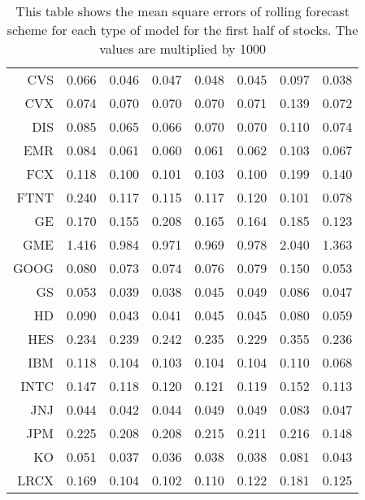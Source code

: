 \begin{table}[ht]
\begin{tabular}{rrrrrrrr}
  CVS & 0.066 & 0.046 & 0.047 & 0.048 & 0.045 & 0.097 & 0.038 \\ 
  CVX & 0.074 & 0.070 & 0.070 & 0.070 & 0.071 & 0.139 & 0.072 \\ 
  DIS & 0.085 & 0.065 & 0.066 & 0.070 & 0.070 & 0.110 & 0.074 \\ 
  EMR & 0.084 & 0.061 & 0.060 & 0.061 & 0.062 & 0.103 & 0.067 \\ 
  FCX & 0.118 & 0.100 & 0.101 & 0.103 & 0.100 & 0.199 & 0.140 \\ 
  FTNT & 0.240 & 0.117 & 0.115 & 0.117 & 0.120 & 0.101 & 0.078 \\ 
  GE & 0.170 & 0.155 & 0.208 & 0.165 & 0.164 & 0.185 & 0.123 \\ 
  GME & 1.416 & 0.984 & 0.971 & 0.969 & 0.978 & 2.040 & 1.363 \\ 
  GOOG & 0.080 & 0.073 & 0.074 & 0.076 & 0.079 & 0.150 & 0.053 \\ 
  GS & 0.053 & 0.039 & 0.038 & 0.045 & 0.049 & 0.086 & 0.047 \\ 
  HD & 0.090 & 0.043 & 0.041 & 0.045 & 0.045 & 0.080 & 0.059 \\ 
  HES & 0.234 & 0.239 & 0.242 & 0.235 & 0.229 & 0.355 & 0.236 \\ 
  IBM & 0.118 & 0.104 & 0.103 & 0.104 & 0.104 & 0.110 & 0.068 \\ 
  INTC & 0.147 & 0.118 & 0.120 & 0.121 & 0.119 & 0.152 & 0.113 \\ 
  JNJ & 0.044 & 0.042 & 0.044 & 0.049 & 0.049 & 0.083 & 0.047 \\ 
  JPM & 0.225 & 0.208 & 0.208 & 0.215 & 0.211 & 0.216 & 0.148 \\ 
  KO & 0.051 & 0.037 & 0.036 & 0.038 & 0.038 & 0.081 & 0.043 \\ 
  LRCX & 0.169 & 0.104 & 0.102 & 0.110 & 0.122 & 0.181 & 0.125 \\ 
   \hline
\end{tabular}
\caption[MSE rolling forecast (1)]{This table shows the mean square errors of rolling forecast scheme for each type of model for the first half of stocks. 
                     The values are multiplied by 1000} 
\label{Table:MSE_r_1}
\end{table}
